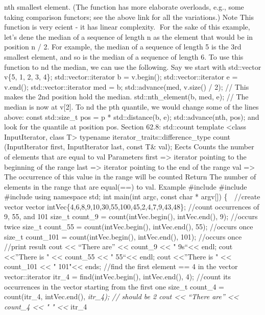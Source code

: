 nth smallest element. (The function has more elaborate overloads, e.g.,
some taking comparison functors; see the above link for all the
variations.) Note This function is very ecient - it has linear
complexity. For the sake of this example, let's dene the median of a
sequence of length n as the element that would be in position n / 2. For
example, the median of a sequence of length 5 is the 3rd smallest
element, and so is the median of a sequence of length 6. To use this
function to nd the median, we can use the following. Say we start with
std::vector v\{5, 1, 2, 3, 4\}; std::vector::iterator b = v.begin();
std::vector::iterator e = v.end(); std::vector::iterator med = b;
std::advance(med, v.size() / 2); // This makes the 2nd position hold the
median. std::nth\_element(b, med, e); // The median is now at v{[}2{]}.
To nd the pth quantile, we would change some of the lines above: const
std::size\_t pos = p * std::distance(b, e); std::advance(nth, pos); and
look for the quantile at position pos. Section 62.8: std::count template
\textless class InputIterator, class T\textgreater{} typename
iterator\_traits::difference\_type count (InputIterator first,
InputIterator last, const T\& val); Eects Counts the number of elements
that are equal to val Parameters first =\textgreater{} iterator pointing
to the beginning of the range last =\textgreater{} iterator pointing to
the end of the range val =\textgreater{} The occurrence of this value in
the range will be counted Return The number of elements in the range
that are equal(==) to val. Example \#include \#include \#include using
namespace std; int main(int argc, const char * argv{[}{]}) \{  //create
vector vector intVec\{4,6,8,9,10,30,55,100,45,2,4,7,9,43,48\}; //count
occurrences of 9, 55, and 101 size\_t count\_9 = count(intVec.begin(),
intVec.end(), 9); //occurs twice size\_t count\_55 =
count(intVec.begin(), intVec.end(), 55); //occurs once size\_t
count\_101 = count(intVec.begin(), intVec.end(), 101); //occurs once
//print result cout \textless\textless{} ``There are''
\textless\textless{} count\_9 \textless\textless{} "
9s``\textless\textless{} endl; cout \textless\textless{}''There is "
\textless\textless{} count\_55 \textless\textless{} "
55``\textless\textless{} endl; cout \textless\textless{}''There is "
\textless\textless{} count\_101 \textless\textless{} "
101"\textless\textless{} ends; //find the first element == 4 in the
vector vector::iterator itr\_4 = find(intVec.begin(), intVec.end(), 4);
//count its occurrences in the vector starting from the first one
size\_t count\_4 = count(itr\_4, intVec.end(), \emph{itr\_4); // should
be 2 cout \textless\textless{} ``There are'' \textless\textless{}
count\_4 \textless\textless{} " " \textless\textless{} }itr\_4
